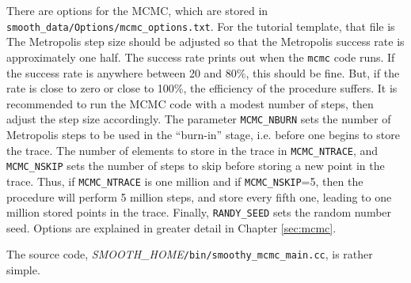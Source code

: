 \documentclass[UserManual.tex]{subfiles}
\begin{document}
\begin{sloppypar}
There are options for the MCMC, which are stored in {\tt smooth\_data/Options/mcmc\_options.txt}. For the tutorial template, that file is
\vspace*{-8pt}{\tt \begin{Verbatim}[commandchars=\\\{\}]
 # This is for the MCMC search of parameter space
 # (not for the emulator tuning)
 #LogFileName smoothlog.txt # comment out for interactive running
 MCMC_METROPOLIS_STEPSIZE 0.06
 MCMC_IGNORE_EMULATOR_ERROR false
 MCMC_NBURN  100
 MCMC_NTRACE 1000
 MCMC_NSKIP  5
 MCMC_IGNORE_EMULATOR_ERROR false
 RANDY_SEED  12345
\end{Verbatim}
}\vspace*{-8pt}
The Metropolis step size should be adjusted so that the Metropolis success rate is approximately one half. The success rate prints out when the {\tt mcmc} code runs. If the success rate is anywhere between 20 and 80\%, this should be fine. But, if the rate is close to zero or close to 100\%, the efficiency of the procedure suffers. It is recommended to run the MCMC code with a modest number of steps, then adjust the step size accordingly. The parameter {\tt MCMC\_NBURN} sets the number of Metropolis steps to be used in the ``burn-in'' stage, i.e. before one begins to store the trace. The number of elements to store in the trace in {\tt MCMC\_NTRACE}, and {\tt MCMC\_NSKIP} sets the number of steps to skip before storing a new point in the trace. Thus, if {\tt MCMC\_NTRACE} is one million and if {\tt MCMC\_NSKIP}=5, then the procedure will perform 5 million steps, and store every fifth one, leading to one million stored points in the trace. Finally, {\tt RANDY\_SEED} sets the random number seed. Options are explained in greater detail in Chapter \ref{sec:mcmc}.

The source code, \textit{SMOOTH\_HOME}{\tt /bin/smoothy\_mcmc\_main.cc}, is rather simple.
\end{sloppypar}
\end{document}

